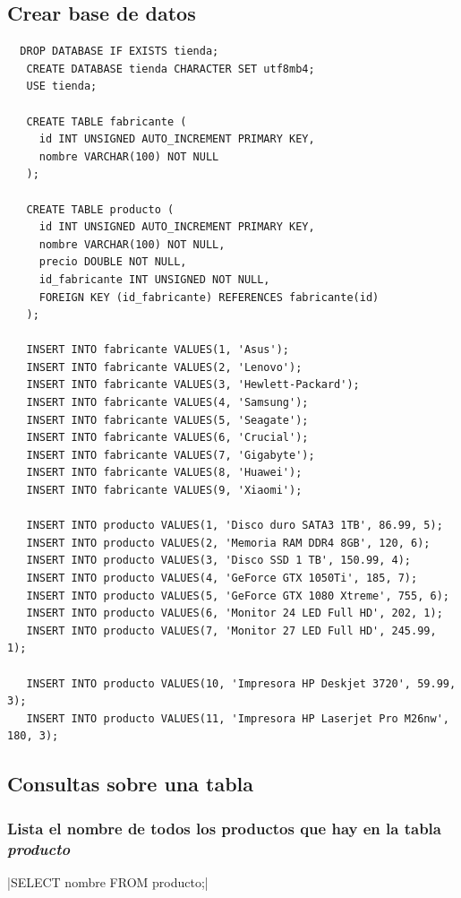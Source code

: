 \documentclass[12pt, letterpaper]{article}
\begin{document}
    \subsection{Crear base de datos}
   \begin{verbatim}
  DROP DATABASE IF EXISTS tienda;
   CREATE DATABASE tienda CHARACTER SET utf8mb4;
   USE tienda;
   
   CREATE TABLE fabricante (
     id INT UNSIGNED AUTO_INCREMENT PRIMARY KEY,
     nombre VARCHAR(100) NOT NULL
   );
   
   CREATE TABLE producto (
     id INT UNSIGNED AUTO_INCREMENT PRIMARY KEY,
     nombre VARCHAR(100) NOT NULL,
     precio DOUBLE NOT NULL,
     id_fabricante INT UNSIGNED NOT NULL,
     FOREIGN KEY (id_fabricante) REFERENCES fabricante(id)
   );
   
   INSERT INTO fabricante VALUES(1, 'Asus');
   INSERT INTO fabricante VALUES(2, 'Lenovo');
   INSERT INTO fabricante VALUES(3, 'Hewlett-Packard');
   INSERT INTO fabricante VALUES(4, 'Samsung');
   INSERT INTO fabricante VALUES(5, 'Seagate');
   INSERT INTO fabricante VALUES(6, 'Crucial');
   INSERT INTO fabricante VALUES(7, 'Gigabyte');
   INSERT INTO fabricante VALUES(8, 'Huawei');
   INSERT INTO fabricante VALUES(9, 'Xiaomi');
   
   INSERT INTO producto VALUES(1, 'Disco duro SATA3 1TB', 86.99, 5);
   INSERT INTO producto VALUES(2, 'Memoria RAM DDR4 8GB', 120, 6);
   INSERT INTO producto VALUES(3, 'Disco SSD 1 TB', 150.99, 4);
   INSERT INTO producto VALUES(4, 'GeForce GTX 1050Ti', 185, 7);
   INSERT INTO producto VALUES(5, 'GeForce GTX 1080 Xtreme', 755, 6);
   INSERT INTO producto VALUES(6, 'Monitor 24 LED Full HD', 202, 1);
   INSERT INTO producto VALUES(7, 'Monitor 27 LED Full HD', 245.99, 1);
  
   INSERT INTO producto VALUES(10, 'Impresora HP Deskjet 3720', 59.99, 3);
   INSERT INTO producto VALUES(11, 'Impresora HP Laserjet Pro M26nw', 180, 3);
   \end{verbatim}
  

  \subsection{Consultas sobre una tabla}
  \subsubsection{Lista el nombre de todos los productos que hay en la tabla \textit{\textbf{producto}}}
  |SELECT nombre  FROM producto;|
\end{document}
